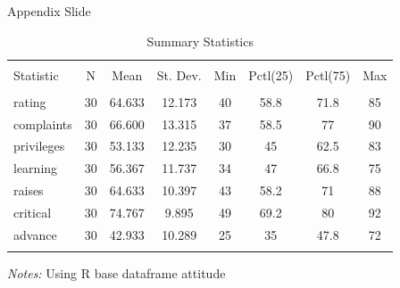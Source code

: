 \documentclass[aspectratio=43]{beamer}
\begin{document}
\begin{frame}{Appendix Slide}\label{appendix1}

    {\fontsize{9}{10}\selectfont
    
        \begin{table}[!htbp] \centering 
        \caption{Summary Statistics}
        \label{appendix_summ_stat}
            \begin{tabular}{@{\extracolsep{5pt}}lccccccc} 
            \hline 
            \hline \\[-1.8ex] 
            Statistic & \multicolumn{1}{c}{N} & \multicolumn{1}{c}{Mean} & \multicolumn{1}{c}{St. Dev.} & \multicolumn{1}{c}{Min} & \multicolumn{1}{c}{Pctl(25)} & \multicolumn{1}{c}{Pctl(75)} & \multicolumn{1}{c}{Max} \\ 
            \hline \\[-1.8ex] 
            rating & 30 & 64.633 & 12.173 & 40 & 58.8 & 71.8 & 85 \\ 
            complaints & 30 & 66.600 & 13.315 & 37 & 58.5 & 77 & 90 \\ 
            privileges & 30 & 53.133 & 12.235 & 30 & 45 & 62.5 & 83 \\ 
            learning & 30 & 56.367 & 11.737 & 34 & 47 & 66.8 & 75 \\ 
            raises & 30 & 64.633 & 10.397 & 43 & 58.2 & 71 & 88 \\ 
            critical & 30 & 74.767 & 9.895 & 49 & 69.2 & 80 & 92 \\ 
            advance & 30 & 42.933 & 10.289 & 25 & 35 & 47.8 & 72 \\ 
            \hline \\[-1.8ex] 
            \end{tabular} 
            
            \textit{Notes:} Using R base dataframe attitude \\ 
        \end{table} 
        
    }
    
    \hyperlink{main1}{}
\end{frame}
\end{document}
